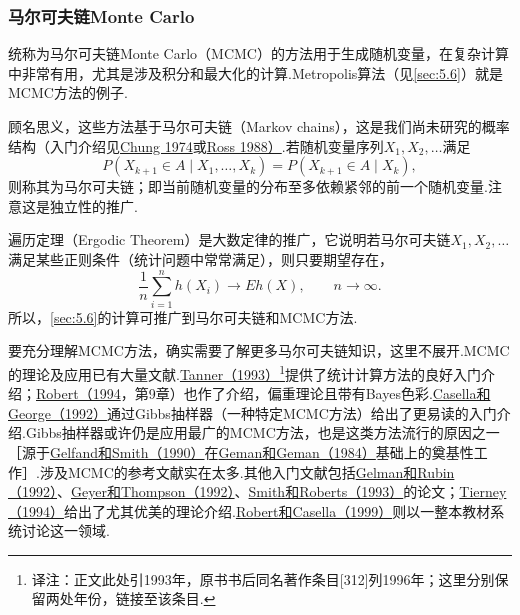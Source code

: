 \subsubsection{马尔可夫链Monte Carlo}\label{sec:5.8.5}
统称为马尔可夫链Monte Carlo（MCMC）的方法用于生成随机变量，在复杂计算中非常有用，尤其是涉及积分和最大化的计算.Metropolis算法（见\autoref{sec:5.6}）就是MCMC方法的例子.

顾名思义，这些方法基于马尔可夫链（Markov chains），这是我们尚未研究的概率结构（入门介绍见\hyperref[bib:source78]{Chung 1974}或\hyperref[bib:source259]{Ross 1988）}.若随机变量序列$X_1,X_2,\ldots$满足
$$P(X_{k+1}\in A\mid X_1,\ldots,X_k)=P(X_{k+1}\in A\mid X_k),$$
则称其为马尔可夫链；即当前随机变量的分布至多依赖紧邻的前一个随机变量.注意这是独立性的推广.

遍历定理（Ergodic Theorem）是大数定律的推广，它说明若马尔可夫链$X_1,X_2,\ldots$满足某些正则条件（统计问题中常常满足），则只要期望存在，
$$\frac1n\sum_{i=1}^n h(X_i)\to Eh(X),\qquad n\to\infty.$$
所以，\autoref{sec:5.6}的计算可推广到马尔可夫链和MCMC方法.

要充分理解MCMC方法，确实需要了解更多马尔可夫链知识，这里不展开.MCMC的理论及应用已有大量文献.\hyperref[bib:source312]{Tanner（1993）}\footnote{译注：正文此处引1993年，原书书后同名著作条目[312]列1996年；这里分别保留两处年份，链接至该条目.}提供了统计计算方法的良好入门介绍；\hyperref[bib:source255]{Robert（1994}，第9章）也作了介绍，偏重理论且带有Bayes色彩.\hyperref[bib:source67]{Casella和George（1992）}通过Gibbs抽样器（一种特定MCMC方法）给出了更易读的入门介绍.Gibbs抽样器或许仍是应用最广的MCMC方法，也是这类方法流行的原因之一［源于\hyperref[bib:source134]{Gelfand和Smith（1990）}在\hyperref[bib:source137]{Geman和Geman（1984）}基础上的奠基性工作］.涉及MCMC的参考文献实在太多.其他入门文献包括\hyperref[bib:source136]{Gelman和Rubin（1992）}、\hyperref[bib:source138]{Geyer和Thompson（1992）}、\hyperref[bib:source293]{Smith和Roberts（1993）}的论文；\hyperref[bib:source315]{Tierney（1994）}给出了尤其优美的理论介绍.\hyperref[bib:source256]{Robert和Casella（1999）}则以一整本教材系统讨论这一领域.
